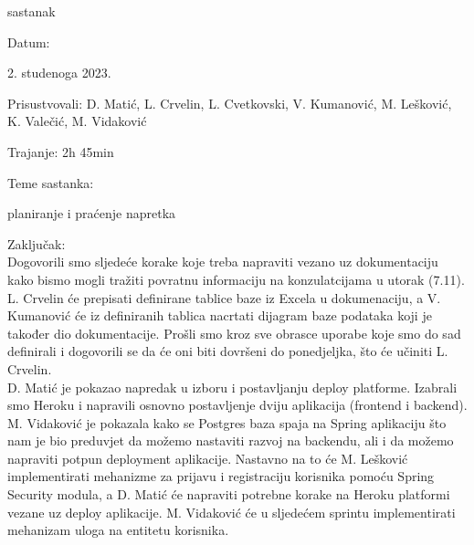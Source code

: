\begin{packed_enum}
\begin{packed_item}
			\end{packed_item}
			

            \item  sastanak
			\item[] \begin{packed_item}
				\item Datum: \date[{2. studenoga 2023.}
				\item Prisustvovali: D. Matić, L. Crvelin, L. Cvetkovski, V. Kumanović, M. Lešković, K. Valečić, M. Vidaković
				\item Trajanje: 2h 45min
				\item Teme sastanka: 
				\begin{packed_item}
					\item  planiranje i praćenje napretka
				\end{packed_item}
                \item Zaključak: \\
                Dogovorili smo sljedeće korake koje treba napraviti vezano uz dokumentaciju kako bismo mogli tražiti povratnu
                informaciju na konzulatcijama u utorak (7.11). L. Crvelin će prepisati definirane tablice baze iz Excela u
                dokumenaciju, a V. Kumanović će iz definiranih tablica nacrtati dijagram baze podataka koji je također dio
                dokumentacije. Prošli smo kroz sve obrasce uporabe koje smo do sad definirali i dogovorili se da će oni biti dovršeni do
                ponedjeljka, što će učiniti L. Crvelin. \\
                
                D. Matić je pokazao napredak u izboru i postavljanju deploy platforme. Izabrali smo Heroku i napravili osnovno
                postavljenje dviju aplikacija (frontend i backend). \\
                
                M. Vidaković je pokazala kako se Postgres baza spaja na Spring aplikaciju što nam je bio preduvjet da možemo nastaviti
                razvoj na backendu, ali i da možemo napraviti potpun deployment aplikacije. Nastavno na to će M. Lešković
                implementirati mehanizme za prijavu i registraciju korisnika pomoću Spring Security modula, a D. Matić će napraviti
                potrebne korake na Heroku platformi vezane uz deploy aplikacije. M. Vidaković će u sljedećem sprintu implementirati
                mehanizam uloga na entitetu korisnika. \\
                

\end{packed_item}
\end{packed_enum}
